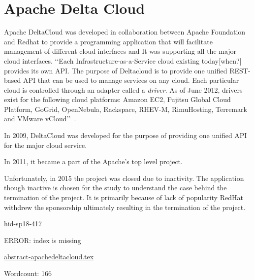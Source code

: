\section{Apache Delta Cloud}

Apache DeltaCloud was developed in collaboration between Apache
Foundation and Redhat to provide a programming application that will
facilitate management of different cloud interfaces and It was
supporting all the major cloud interfaces.  ‘‘Each
Infrastructure-as-a-Service cloud existing today[when?] provides its
own API. The purpose of Deltacloud is to provide one unified
REST-based API that can be used to manage services on any cloud. Each
particular cloud is controlled through an adapter called a
\textit{driver}. As of June 2012, drivers exist for the following cloud
platforms: Amazon EC2, Fujitsu Global Cloud Platform, GoGrid,
OpenNebula, Rackspace, RHEV-M, RimuHosting, Terremark and VMware
vCloud’’~\cite{hid-sp18-417-wiki-deltacloud}.

In 2009, DeltaCloud was developed for the purpose of providing one
unified API for the major cloud service.

In 2011, it became a part of the Apache’s top level project. 

Unfortunately, in 2015 the project was closed due to inactivity.  The
application though inactive is chosen for the study to understand the
case behind the termination of the project.  It is primarily because
of lack of popularity RedHat withdrew the sponsorship ultimately
resulting in the termination of the project.


\begin{IU}

hid-sp18-417

ERROR: index is missing

\href{https://github.com/cloudmesh-community/hid-sp18-417/blob/master//technology/abstract-apachedeltacloud.tex}{abstract-apachedeltacloud.tex}

 

Wordcount: 166

\end{IU}


